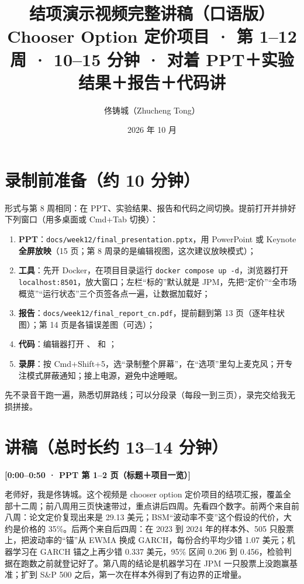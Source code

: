 \documentclass[11pt]{ctexart}
\title{\textbf{结项演示视频完整讲稿（口语版）}\\
\large Chooser Option 定价项目 · 第 1--12 周 · 10--15 分钟 · 对着 PPT＋实验结果＋报告＋代码讲}
\author{佟铸城（Zhucheng Tong）}
\date{2026 年 10 月}
\newcommand{\cue}[1]{\noindent\colorbox{gray!15}{\parbox{\dimexpr\linewidth-2\fboxsep}{\textbf{#1}}}\par\smallskip}
\begin{document}
\maketitle

\section*{录制前准备（约 10 分钟）}
形式与第 8 周相同：在 PPT、实验结果、报告和代码之间切换。提前打开并排好下列窗口（用多桌面或 Cmd+Tab 切换）：
\begin{enumerate}
  \item \textbf{PPT}：\texttt{docs/week12/final\_presentation.pptx}，用 PowerPoint 或 Keynote \textbf{全屏放映}（15 页；第 8 周录的是编辑视图，这次建议放映模式）；
  \item \textbf{工具}：先开 Docker，在项目目录运行 \texttt{docker compose up -d}，浏览器打开 \texttt{localhost:8501}，放大窗口；左栏“标的”默认就是 JPM，先把“定价”“全市场概览”“运行状态”三个页签各点一遍，让数据加载好；
  \item \textbf{报告}：\texttt{docs/week12/final\_report\_cn.pdf}，提前翻到第 13 页（逐年柱状图）；第 14 页是各锚误差图（可选）；
  \item \textbf{代码}：编辑器打开 、 和 ；
  \item \textbf{录屏}：按 Cmd+Shift+5，选“录制整个屏幕”，在“选项”里勾上麦克风；开专注模式屏蔽通知；接上电源，避免中途睡眠。
\end{enumerate}
先不录音干跑一遍，熟悉切屏路线；可以分段录（每段一到三页），录完交给我无损拼接。

\section*{讲稿（总时长约 13--14 分钟）}

\cue{[0:00--0:50 · PPT 第 1--2 页（标题＋项目一览）]}
老师好，我是佟铸城。这个视频是 chooser option 定价项目的结项汇报，覆盖全部十二周；前八周用三页快速带过，重点讲后四周。先看四个数字。前两个来自前八周：论文定价复现出来是 29.13 美元；BSM“波动率不变”这个假设的代价，大约是价格的 35\%。后两个来自后四周：在 2023 到 2024 年的样本外、505 只股票上，把波动率的“锚”从 EWMA 换成 GARCH，每份合约平均少错 1.07 美元；机器学习在 GARCH 锚之上再少错 0.337 美元，95\% 区间 0.206 到 0.456，检验判据在跑数之前就登记好了。第八周的结论是机器学习在 JPM 一只股票上没跑赢基准；扩到 S\&P 500 之后，第一次在样本外得到了有边界的正增量。
\end{document}
